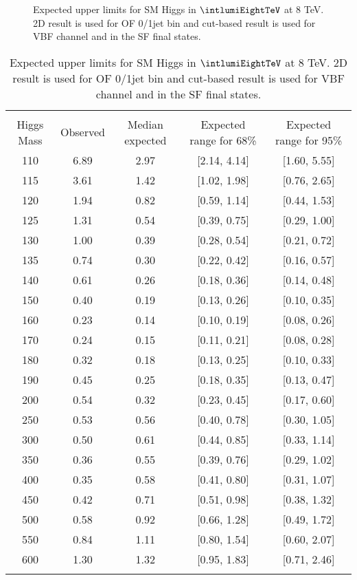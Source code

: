 \begin{figure}[!hbtp]
\centering
\caption{Expected upper limits for SM Higgs in $\intlumiEightTeV$ at 8 TeV.
2D result is used for OF 0/1jet bin and cut-based result is used for VBF channel
and in the SF final states. }
\label{fig:uls_2d01_cut2_cutsf}
\end{figure}
\begin{table}[!htbp]
\begin{center}
\begin{tabular}{c c c c c}
\hline
\vspace{-3mm} && \\
Higgs Mass & Observed  & Median expected & Expected range for 68\% & Expected range for 95\%   \\
\hline
110 & 6.89 & 2.97 & [2.14, 4.14] & [1.60, 5.55] \\
115 & 3.61 & 1.42 & [1.02, 1.98] & [0.76, 2.65] \\
120 & 1.94 & 0.82 & [0.59, 1.14] & [0.44, 1.53] \\
125 & 1.31 & 0.54 & [0.39, 0.75] & [0.29, 1.00] \\
130 & 1.00 & 0.39 & [0.28, 0.54] & [0.21, 0.72] \\
135 & 0.74 & 0.30 & [0.22, 0.42] & [0.16, 0.57] \\
140 & 0.61 & 0.26 & [0.18, 0.36] & [0.14, 0.48] \\
150 & 0.40 & 0.19 & [0.13, 0.26] & [0.10, 0.35] \\
160 & 0.23 & 0.14 & [0.10, 0.19] & [0.08, 0.26] \\
170 & 0.24 & 0.15 & [0.11, 0.21] & [0.08, 0.28] \\
180 & 0.32 & 0.18 & [0.13, 0.25] & [0.10, 0.33] \\
190 & 0.45 & 0.25 & [0.18, 0.35] & [0.13, 0.47] \\
200 & 0.54 & 0.32 & [0.23, 0.45] & [0.17, 0.60] \\
250 & 0.53 & 0.56 & [0.40, 0.78] & [0.30, 1.05] \\
300 & 0.50 & 0.61 & [0.44, 0.85] & [0.33, 1.14] \\
350 & 0.36 & 0.55 & [0.39, 0.76] & [0.29, 1.02] \\
400 & 0.35 & 0.58 & [0.41, 0.80] & [0.31, 1.07] \\
450 & 0.42 & 0.71 & [0.51, 0.98] & [0.38, 1.32] \\
500 & 0.58 & 0.92 & [0.66, 1.28] & [0.49, 1.72] \\
550 & 0.84 & 1.11 & [0.80, 1.54] & [0.60, 2.07] \\
600 & 1.30 & 1.32 & [0.95, 1.83] & [0.71, 2.46] \\
\vspace{-3mm} && \\
\hline
\end{tabular}
\caption{Expected upper limits for SM Higgs in $\intlumiEightTeV$ at 8 TeV.
2D result is used for OF 0/1jet bin and cut-based result is used for VBF channel
and in the SF final states. }
\label{tab:uls_2d01_cut2_cutsf}
\end{center}
\end{table}


